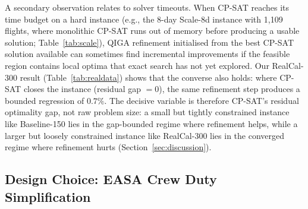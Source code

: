 \documentclass[12pt,number]{elsarticle}
\begin{document}
A secondary observation relates to solver timeouts. When CP-SAT reaches its time budget on a hard instance (e.g., the 8-day Scale-8d instance with 1{,}109 flights, where monolithic CP-SAT runs out of memory before producing a usable solution; Table~\ref{tab:scale}), QIGA refinement initialised from the best CP-SAT solution available can sometimes find incremental improvements if the feasible region contains local optima that exact search has not yet explored. Our RealCal-300 result (Table~\ref{tab:realdata}) shows that the converse also holds: where CP-SAT closes the instance (residual gap $=0$), the same refinement step produces a bounded regression of $0.7\%$. The decisive variable is therefore CP-SAT's residual optimality gap, not raw problem size: a small but tightly constrained instance like Baseline-150 lies in the gap-bounded regime where refinement helps, while a larger but loosely constrained instance like RealCal-300 lies in the converged regime where refinement hurts (Section~\ref{sec:discussion}).

\subsection{Design Choice: EASA Crew Duty Simplification}
\end{document}
